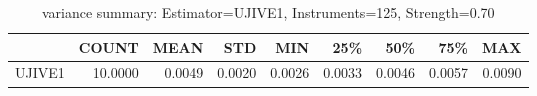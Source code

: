 \begin{table}[ht]
\centering
\caption{variance summary: Estimator=UJIVE1, Instruments=125, Strength=0.70}
\begin{tabular}{lrrrrrrrr}
\toprule
 & COUNT & MEAN & STD & MIN & 25\% & 50\% & 75\% & MAX \\
\midrule
UJIVE1 & 10.0000 & 0.0049 & 0.0020 & 0.0026 & 0.0033 & 0.0046 & 0.0057 & 0.0090 \\
\bottomrule
\end{tabular}
\end{table}
